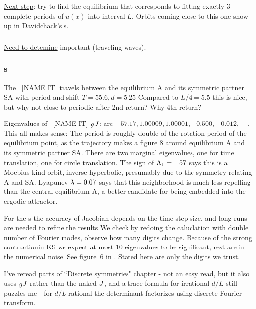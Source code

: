 \underline{Next step}: try to find the equilibrium that corresponds to fitting
exactly 3 complete periods of $u(x)$ into interval $L$.
Orbits coming close to this one
show up in Davidchack's \rpo s.

\subsubsection{\Reqva}

\underline{Need to detemine} important {\Reqva} (traveling waves).

\subsubsection{\Rpo s}


The \rpo\ [NAME IT] travels between the equilibrium A and its symmetric partner SA 
with period and shift
$T=55.6, d=5.25$
Compared to $L/4 = 5.5$
this is nice, but why not close to periodic after 2nd return? Why 4th return?


Eigenvalues of \rpo\ [NAME IT] $g{J}$: are
$ -57.17,  1.00009, 1.00001, -0.500, -0.012, \cdots$ .
This all makes sense: The period is roughly double of the rotation period of
the equilibrium point, as the trajectory makes a figure 8 around equilibrium A and
its symmetric partner SA.
 There are two
marginal eigenvalues, one for time translation, one for
circle translation. 
The sign of $\Lambda_{1}=-57$ says this is a Moebius-kind orbit,
inverse hyperbolic, presumably due to the symmetry relating A and SA.
Lyapunov $\lambda=0.07$ says that this neighborhood is much less repelling than
the central equilibrium A, a better candidate for being embedded into the
ergodic attractor.

For the \rpo s the accuracy of Jacobian depends
on the time step size, and long runs are needed to refine the results
We check by redoing the caluclation with double 
number of Fourier modes, observe how many digits
change. 
Because of the strong contractionin KS we expect at most 10 eigenvalues to be
significant, rest are in the numerical noise. See figure~6 in
.
Stated here are only the digits we trust.


I've reread parts of ``Discrete symmetries" chapter - not an easy read, but
it also uses $g{J}$ rather than the naked ${J}$, and a trace formula for irrational
$d/L$ still puzzles me - for $d/L$ rational the determinant factorizes using
discrete Fourier transform.

